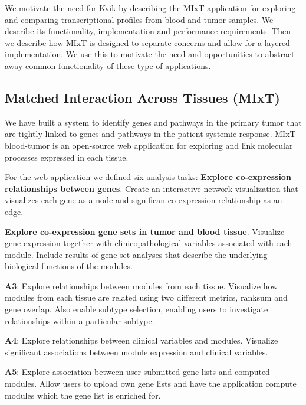 
We motivate the need for Kvik by describing the MIxT application for exploring
and comparing transcriptional profiles from blood and tumor samples. We
describe its functionality, implementation 
and performance requirements.
Then we describe how MIxT
is designed to separate concerns and allow for a layered implementation. We use
this to motivate the need and opportunities to abstract away common
functionality of these type of applications.

\subsection*{Matched Interaction Across Tissues (MIxT)}
We have built a system to identify genes and pathways in the primary tumor that
are tightly linked to genes and pathways in the patient systemic
response\cite{dumeaux2017}. MIxT blood-tumor is an open-source web application
for exploring and link molecular processes expressed in each tissue.  

For the web application we defined six analysis tasks: 
\textbf{Explore co-expression relationships between genes}. Create an
interactive network visualization that visualizes each gene as a node and
significan co-expression relationship as an edge. 

\textbf{Explore co-expression gene sets in tumor and blood tissue}.
Visualize gene expression together with clinicopathological variables associated
with each module. Include results of gene set analyses that describe the
underlying biological functions of the modules. 

\textbf{A3}: Explore relationships between modules from each tissue.
Visualize how modules from each tissue are related using two different
metrics, ranksum and gene overlap. Also enable subtype selection,
enabling users to investigate relationships within a particular subtype. 

\textbf{A4}: Explore relationships between clinical variables and modules.
Visualize significant associations between module expression and
clinical variables.

\textbf{A5}: Explore association between user-submitted gene lists and computed
modules. Allow users to upload own gene lists and have the application compute
modules which the gene list is enriched for. 

